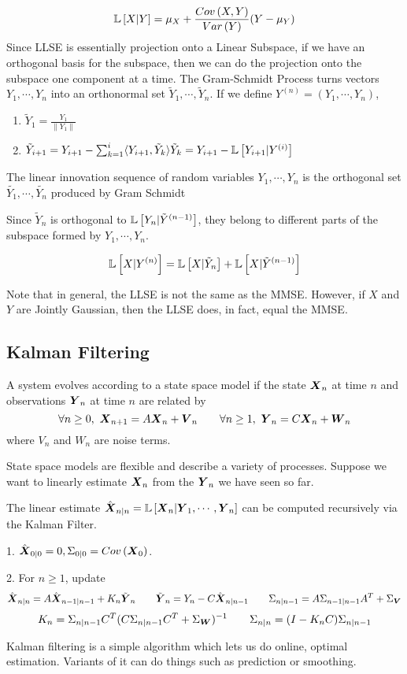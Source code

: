 \[
	\mathbb{L}\left[X|Y\right] = \mu_X + \frac{Cov\left(X, Y\right)}{Var\left(Y\right)}(Y - \mu_Y)
\]
Since LLSE is essentially projection onto a Linear Subspace, if we have an orthogonal basis for the subspace, then we can do the projection onto the subspace one component at a time.
The Gram-Schmidt Process turns vectors $Y_1,\cdots,Y_n$ into an orthonormal set $\tilde{Y}_1, \cdots, \tilde{Y}_n$.
If we define $Y^{(n)}=(Y_1, \cdots, Y_n)$,
\begin{enumerate}
	\item $\tilde{Y}_1 = \frac{Y_1}{\|Y_1\|}$
	\item $\tilde{Y}_{i+1} = Y_{i+1} - \sum_{k=1}^{i}\langle Y_{i+1}, \tilde{Y}_k \rangle \tilde{Y}_k = Y_{i+1} - \mathbb{L}\left[Y_{i+1}|Y^{(i)}\right]$
\end{enumerate}
\begin{definition}
	The linear innovation sequence of random variables $Y_1,\cdots,Y_n$ is the orthogonal set $\tilde{Y_1}, \cdots, \tilde{Y_n}$ produced by Gram Schmidt
	\label{defn:innovation}
\end{definition}
Since $\tilde{Y}_{n}$ is orthogonal to $\mathbb{L}\left[Y_n|\tilde{Y}^{(n-1)}\right]$, they belong to different parts of the subspace formed by $Y_1,\cdots,Y_n$.
\begin{theorem}
	\[
		\mathbb{L}\left[X|Y^{(n)}\right] = \mathbb{L}\left[X|\tilde{Y}_n\right] + \mathbb{L}\left[X|\tilde{Y}^{(n-1)}\right]
	\]
	\label{thm:orthogonal-llse}
\end{theorem}
Note that in general, the LLSE is not the same as the MMSE.
However, if $X$ and $Y$ are Jointly Gaussian, then the LLSE does, in fact, equal the MMSE.
\subsection{Kalman Filtering}
\begin{definition}
	A system evolves according to a state space model if the state $\boldsymbol{X}_n$ at time $n$ and observations $\boldsymbol{Y}_n$ at time $n$ are related by
	\[
		\forall n\geq 0,\ \bs{X}_{n+1} = A\bs{X}_n + \bs{V}_n \qquad \forall n\geq 1,\ \bs{Y}_n=C\bs{X}_n+\bs{W}_n
	\]
	where $V_n$ and $W_n$ are noise terms.
	\label{defn:state-space}
\end{definition}
State space models are flexible and describe a variety of processes.
Suppose we want to linearly estimate $\boldsymbol{X}_n$ from the $\boldsymbol{Y}_n$ we have seen so far.
\begin{theorem}
	The linear estimate $\hat{\boldsymbol{X}}_{n|n} = \mathbb{L}\left[\boldsymbol{X}_n|\boldsymbol{Y}_1,\cdots,\boldsymbol{Y}_n\right]$ can be computed recursively via the Kalman Filter.
	
	1. $\hat{\boldsymbol{X}}_{0|0} = 0, \Sigma_{0|0} = Cov\left(\boldsymbol{X}_0\right)$.

	2. For $n\geq 1$, update
	\[
		\hat{\boldsymbol{X}}_{n|n} = A\hat{\boldsymbol{X}}_{n-1|n-1} + K_n\tilde{\boldsymbol{Y}}_n \qquad \tilde{\boldsymbol{Y}}_n = Y_n - C\hat{\boldsymbol{X}}_{n|n-1} \qquad \Sigma_{n|n-1} = A\Sigma_{n-1|n-1}A^T+\Sigma_{\boldsymbol{V}}
	\]
	\[
		K_n = \Sigma_{n|n-1}C^T(C\Sigma_{n|n-1}C^T+\Sigma_{\boldsymbol{W}})^{-1} \qquad \Sigma_{n|n}=(I - K_nC)\Sigma_{n|n-1}
	\]
	\label{thm:kalman-filter}
\end{theorem}
Kalman filtering is a simple algorithm which lets us do online, optimal estimation.
Variants of it can do things such as prediction or smoothing.


